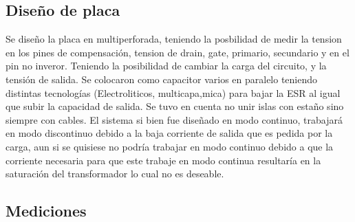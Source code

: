 %
%
%

\subsection{Diseño de placa}
Se diseño la placa en multiperforada, teniendo la posbilidad de medir la tension en los pines de compensación, tension de drain, gate, primario, secundario y en el pin no inveror.
Teniendo la posibilidad de cambiar la carga del circuito, y la tensión de salida.
Se colocaron como capacitor varios en paralelo teniendo distintas tecnologías (Electroliticos, multicapa,mica) para bajar la ESR al igual que subir la capacidad de salida. 
Se tuvo en cuenta no unir islas con estaño sino siempre con cables. 
El sistema si bien fue diseñado en modo continuo, trabajará en modo discontinuo debido a la baja corriente de salida que es pedida por la carga, aun si se quisiese no podría trabajar en modo continuo debido a que la corriente necesaria para que este trabaje en modo continua resultaría en la saturación del transformador lo cual no es deseable.
\subsection{Mediciones}


%